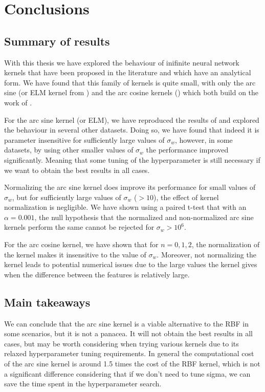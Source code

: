 \chapter{Conclusions}
\label{sec:conclusions}

\section{Summary of results}

With this thesis we have explored the behaviour of inifinite neural network
kernels that have been proposed in the literature and which have an analytical
form. We have found that this family of kernels is quite small, with only
the arc sine (or ELM kernel from \cite{frenayParameterinsensitiveKernelExtreme2011})
and the arc cosine kernels (\cite{choLargemarginClassificationInfinite2010}) which
both build on the work of \textcite{williamsComputingInfiniteNetworks1996}.

For the arc sine kernel (or ELM), we have reproduced the results of \textcite{frenayParameterinsensitiveKernelExtreme2011}
and explored the behaviour in several other datasets. Doing so, we have found that
indeed it is parameter insensitive for sufficiently large values of $\sigma_w$,
however, in some datasets, by using other smaller values of $\sigma_w$ the performance
improved significantly. Meaning that some tuning of the hyperparameter is still
necessary if we want to obtain the best results in all cases.

Normalizing the arc sine kernel does improve its performance for small values
of $\sigma_w$, but for sufficiently large values of $\sigma_w$ ($>10$), the
effect of kernel normalization is negligible. We have shown using a paired
t-test that with an $\alpha=0.001$, the null hypothesis that the normalized
and non-normalized arc sine kernels perform the same cannot be rejected for
$\sigma_w > 10^6$.

For the arc cosine kernel, we have shown that for $n=0,1,2$, the normalization
of the kernel makes it insensitive to the value of $\sigma_w$. Moreover, not
normalizing the kernel leads to potential numerical issues due to the large
values the kernel gives when the difference between the features is relatively
large.

\section{Main takeaways}

We can conclude that the arc sine kernel is a viable alternative to the RBF
in some scenarios, but it is not a panacea. It will not obtain the best results
in all cases, but may be worth considering when trying various kernels due to
its relaxed hyperparameter tuning requirements. In general the computational
cost of the arc sine kernel is around 1.5 times the cost of the RBF kernel,
which is not a significant difference considering that if we don't need to tune
sigma, we can save the time spent in the hyperparameter search.

